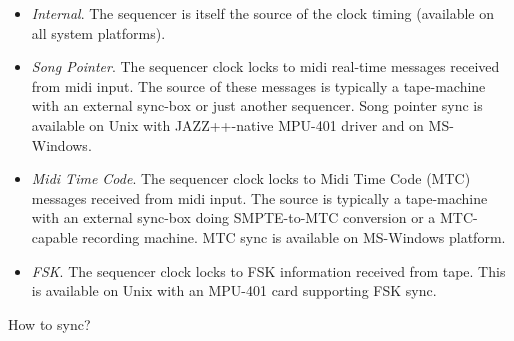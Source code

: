\documentclass[letterpaper]{report}
\begin{document}
\begin{itemize}

\item {\em Internal}. The sequencer is itself the source of the clock timing
(available on all system platforms).

\item {\em Song Pointer}. The sequencer clock locks to midi real-time messages
received from midi input. The source of these messages is typically a
tape-machine with an external sync-box or just another sequencer. Song
pointer sync is available on Unix with JAZZ++-native MPU-401 driver and on
MS-Windows.

\item {\em Midi Time Code}. The sequencer clock locks to Midi Time Code
(MTC) messages received from midi input. The source is typically a
tape-machine with an external sync-box doing SMPTE-to-MTC conversion or
a MTC-capable recording machine. MTC sync is available on MS-Windows platform.

\item {\em FSK}. The sequencer clock locks to FSK information received from
tape. This is available on Unix with an MPU-401 card supporting FSK
sync.

\end{itemize}

How to sync?
\end{document}
